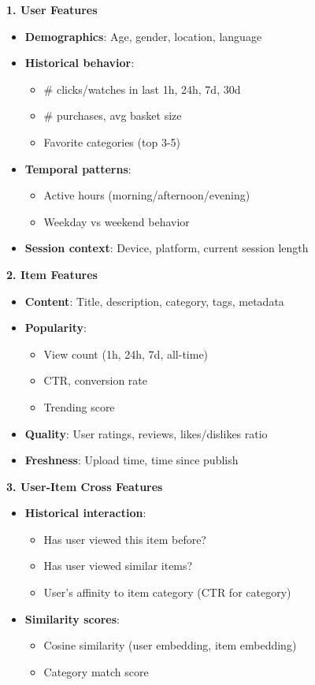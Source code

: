 \documentclass[10pt]{article}
\begin{document}
\textbf{1. User Features}
\begin{itemize}
\item \textbf{Demographics}: Age, gender, location, language
\item \textbf{Historical behavior}:
\begin{itemize}
\item \# clicks/watches in last 1h, 24h, 7d, 30d
\item \# purchases, avg basket size
\item Favorite categories (top 3-5)
\end{itemize}
\item \textbf{Temporal patterns}:
\begin{itemize}
\item Active hours (morning/afternoon/evening)
\item Weekday vs weekend behavior
\end{itemize}
\item \textbf{Session context}: Device, platform, current session length
\end{itemize}

\textbf{2. Item Features}
\begin{itemize}
\item \textbf{Content}: Title, description, category, tags, metadata
\item \textbf{Popularity}:
\begin{itemize}
\item View count (1h, 24h, 7d, all-time)
\item CTR, conversion rate
\item Trending score
\end{itemize}
\item \textbf{Quality}: User ratings, reviews, likes/dislikes ratio
\item \textbf{Freshness}: Upload time, time since publish
\end{itemize}

\textbf{3. User-Item Cross Features}
\begin{itemize}
\item \textbf{Historical interaction}:
\begin{itemize}
\item Has user viewed this item before?
\item Has user viewed similar items?
\item User's affinity to item category (CTR for category)
\end{itemize}
\item \textbf{Similarity scores}:
\begin{itemize}
\item Cosine similarity (user embedding, item embedding)
\item Category match score
\end{itemize}
\end{itemize}
\end{document}
